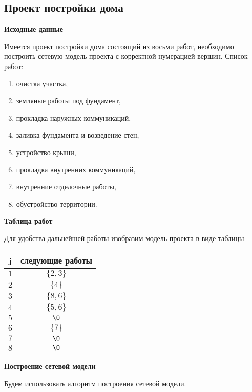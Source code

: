 \subsection{Проект постройки дома}
\label{proj:house_building_project}

\textbf{Исходные данные}

Имеется проект постройки дома состоящий из восьми работ, необходимо построить сетевую модель проекта с корректной нумерацией вершин. Список работ:

\begin{enumerate}[nosep]
	\item очистка участка,
	\item земляные работы под фундамент,
	\item прокладка наружных коммуникаций,
	\item заливка фундамента и возведение стен,
	\item устройство крыши,
	\item прокладка внутренних коммуникаций,
	\item внутренние отделочные работы,
	\item обустройство территории.
\end{enumerate}

\bigskip

\textbf{Таблица работ}

Для удобства дальнейшей работы изобразим модель проекта в виде таблицы

\begin{table}[H]
	\centering
	\begin{tabular}{ | c | c | } 
		\hline
		j & следующие работы \\\hline
		$1$ & $\{2,3\}$ \\\hline
		$2$ & $\{4\}$ \\\hline
		$3$ & $\{8,6\}$ \\\hline
		$4$ & $\{5,6\}$ \\\hline
		$5$ & $\O$ \\\hline
		$6$ & $\{7\}$ \\\hline
		$7$ & $\O$ \\\hline
		$8$ & $\O$ \\\hline
	\end{tabular}
\end{table}

\bigskip

\textbf{Построение сетевой модели}

Будем использовать \hyperref[alg:building_network_model]{алгоритм построения сетевой модели}.

